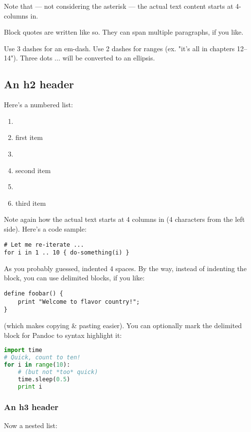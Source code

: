 Note that --- not considering the asterisk --- the actual text
content starts at 4-columns in.

\begin{displayquote}
Block quotes are
written like so.
They can span multiple paragraphs,
if you like.

\end{displayquote}

Use 3 dashes for an em-dash. Use 2 dashes for ranges (ex. "it's all in
chapters 12--14"). Three dots ... will be converted to an ellipsis.
\subsection{An h2 header}
Here's a numbered list:

\begin{enumerate}
\item \item first item

\item \item second item

\item \item third item

\end{enumerate}

Note again how the actual text starts at 4 columns in (4 characters
from the left side). Here's a code sample:

\begin{verbatim}
# Let me re-iterate ...
for i in 1 .. 10 { do-something(i) }
\end{verbatim}
As you probably guessed, indented 4 spaces. By the way, instead of
indenting the block, you can use delimited blocks, if you like:

\begin{verbatim}
define foobar() {
    print "Welcome to flavor country!";
}
\end{verbatim}
(which makes copying & pasting easier). You can optionally mark the
delimited block for Pandoc to syntax highlight it:


\begin{lstlisting}[language=python]
import time
# Quick, count to ten!
for i in range(10):
    # (but not *too* quick)
    time.sleep(0.5)
    print i
\end{lstlisting}
\subsubsection{An h3 header}
Now a nested list:

